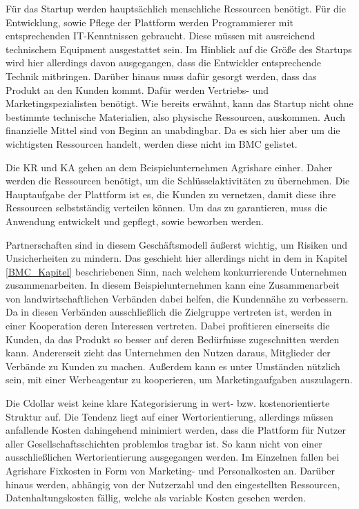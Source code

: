 Für das Startup werden hauptsächlich menschliche Ressourcen benötigt. Für die Entwicklung, sowie Pflege der Plattform werden Programmierer mit entsprechenden IT-Kenntnissen gebraucht. Diese müssen mit ausreichend technischem Equipment ausgestattet sein. Im Hinblick auf die Größe des Startups wird hier allerdings davon ausgegangen, dass die Entwickler entsprechende Technik mitbringen. Darüber hinaus muss dafür gesorgt werden, dass das Produkt an den Kunden kommt. Dafür werden Vertriebs- und Marketingspezialisten benötigt. Wie bereits erwähnt, kann das Startup nicht ohne bestimmte technische Materialien, also physische Ressourcen, auskommen. Auch finanzielle Mittel sind von Beginn an unabdingbar. Da es sich hier aber um die wichtigsten Ressourcen handelt, werden diese nicht im \ac{BMC} gelistet.

Die \ac{KR} und \ac{KA} gehen an dem Beispielunternehmen Agrishare einher. Daher werden die Ressourcen benötigt, um die Schlüsselaktivitäten zu übernehmen. Die Hauptaufgabe der Plattform ist es, die Kunden zu vernetzen, damit diese ihre Ressourcen selbstständig verteilen können. Um das zu garantieren, muss die Anwendung entwickelt und gepflegt, sowie beworben werden. 

Partnerschaften sind in diesem Geschäftsmodell äußerst wichtig, um Risiken und Unsicherheiten zu mindern. Das geschieht hier allerdings nicht in dem in Kapitel \ref{BMC_Kapitel} beschriebenen Sinn, nach welchem konkurrierende Unternehmen zusammenarbeiten. In diesem Beispielunternehmen kann eine Zusammenarbeit von landwirtschaftlichen Verbänden dabei helfen, die Kundennähe zu verbessern. Da in diesen Verbänden ausschließlich die Zielgruppe vertreten ist, werden in einer Kooperation deren Interessen vertreten. Dabei profitieren einerseits die Kunden, da das Produkt so besser auf deren Bedürfnisse zugeschnitten werden kann. Andererseit zieht das Unternehmen den Nutzen daraus, Mitglieder der Verbände zu Kunden zu machen. Außerdem kann es unter Umständen nützlich sein, mit einer Werbeagentur zu kooperieren, um Marketingaufgaben auszulagern. 

Die \ac{Cdollar} weist keine klare Kategorisierung in wert- bzw. kostenorientierte Struktur auf. Die Tendenz liegt auf einer Wertorientierung, allerdings müssen anfallende Kosten dahingehend minimiert werden, dass die Plattform für Nutzer aller Gesellschaftsschichten problemlos tragbar ist. So kann nicht von einer ausschließlichen Wertorientierung ausgegangen werden. Im Einzelnen fallen bei Agrishare Fixkosten in Form von Marketing- und Personalkosten an. Darüber hinaus werden, abhängig von der Nutzerzahl und den eingestellten Ressourcen, Datenhaltungskosten fällig, welche als variable Kosten gesehen werden.